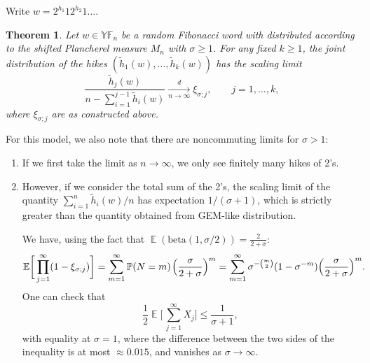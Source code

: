\documentclass[letterpaper,11pt,oneside,reqno]{article}
\numberwithin{equation}{section}
\newcommand{\ssp}{\hspace{1pt}}
\newtheorem{theorem}[proposition]{Theorem}
\theoremstyle{definition}
\begin{document}
Write $w=2^{h_1}12^{h_2}1\ldots $.

\begin{theorem}
	Let $w\in \mathbb{YF}_n$ be a random Fibonacci word with distributed
	according to the shifted Plancherel measure $M_n$ with $\sigma\ge1$.
	For any fixed $k\ge 1$, the joint distribution of the
	hikes $(\tilde h_1(w), \ldots, \tilde h_k(w))$ has the scaling limit
	\begin{equation*}
		\frac{\tilde h_j(w)}{n-\sum_{i=1}^{j-1}\tilde h_i(w)}\xrightarrow[n\to\infty]{d}\xi_{\sigma;j},\qquad j=1,\ldots,k,
	\end{equation*}
	where $\xi_{\sigma;j}$ are as constructed above.
\end{theorem}


For this model, we also note that there are noncommuting limits for $\sigma>1$:
\begin{enumerate}
	\item If we first take the limit as $n\to \infty$, we only see finitely
		many hikes of 2's.
	\item However, if we consider the total sum of the 2's, the scaling limit of the
		quantity $\sum_{i=1}^n \tilde h_i(w)/n$ has expectation $1/(\sigma+1)$,
		which is strictly greater than the quantity obtained from GEM-like distribution.

	We have, using the fact that
	$\operatorname{\mathbb{E}}(\mathrm{beta}(1,\sigma/2))=\frac{2}{2+\sigma}$:
	\begin{equation*}
		\operatorname{\mathbb{E}}\biggl[\,
		\prod_{j=1}^{\infty}(1-\xi_{\sigma;j})
		\biggr]
		=
		\sum_{m=1}^{\infty}
		\operatorname{\mathbb{P}}(N=m)\ssp
		\Bigl( \frac{\sigma}{2+\sigma} \Bigr)^m
		=
		\sum_{m=1}^{\infty}
		\sigma^{-\binom m2}(1-\sigma^{-m})
		\Bigl( \frac{\sigma}{2+\sigma} \Bigr)^m.
	\end{equation*}
	One can check that
	\begin{equation}
		\label{eq:expectation_to_compare}
		\frac{1}{2}\operatorname{\mathbb{E}}\biggl[\,\sum_{j=1}^{\infty}X_j\biggr]
		\le \frac{1}{\sigma+1},
	\end{equation}
	with equality at $\sigma=1$,
	where the difference between the two sides of the inequality
	is at most $\approx 0.015$, and vanishes as $\sigma\to\infty$.
\end{enumerate}




\end{document}
